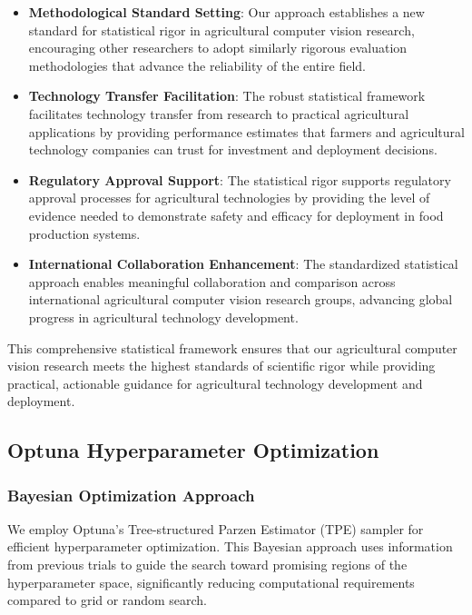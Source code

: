 \begin{itemize}
    \item \textbf{Methodological Standard Setting}: Our approach establishes a new standard for statistical rigor in agricultural computer vision research, encouraging other researchers to adopt similarly rigorous evaluation methodologies that advance the reliability of the entire field.
    
    \item \textbf{Technology Transfer Facilitation}: The robust statistical framework facilitates technology transfer from research to practical agricultural applications by providing performance estimates that farmers and agricultural technology companies can trust for investment and deployment decisions.
    
    \item \textbf{Regulatory Approval Support}: The statistical rigor supports regulatory approval processes for agricultural technologies by providing the level of evidence needed to demonstrate safety and efficacy for deployment in food production systems.
    
    \item \textbf{International Collaboration Enhancement}: The standardized statistical approach enables meaningful collaboration and comparison across international agricultural computer vision research groups, advancing global progress in agricultural technology development.
\end{itemize}

This comprehensive statistical framework ensures that our agricultural computer vision research meets the highest standards of scientific rigor while providing practical, actionable guidance for agricultural technology development and deployment.

\subsection{Optuna Hyperparameter Optimization}

\subsubsection{Bayesian Optimization Approach}

We employ Optuna's Tree-structured Parzen Estimator (TPE) sampler for efficient hyperparameter optimization. This Bayesian approach uses information from previous trials to guide the search toward promising regions of the hyperparameter space, significantly reducing computational requirements compared to grid or random search.

